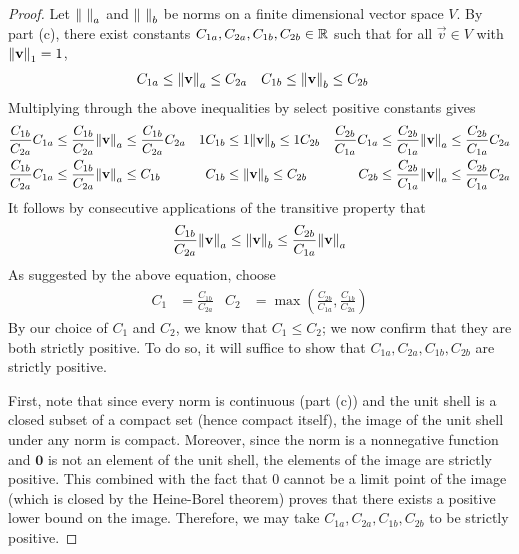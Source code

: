 \documentclass[../psets.tex]{subfiles}
\begin{document}
\begin{enumerate}
\begin{enumerate}
\begin{proof}
            Let $\norm{\ }_a$ and $\norm{\ }_b$ be norms on a finite dimensional vector space $V$. By part (c), there exist constants $C_{1a},C_{2a},C_{1b},C_{2b}\in\mathbb{R}$ such that for all $\vec{v}\in V$ with $\norm{\mathbf{v}}_1=1$,
            \begin{align*}
                C_{1a} &\leq \norm{\mathbf{v}}_a \leq C_{2a}&
                C_{1b} &\leq \norm{\mathbf{v}}_b \leq C_{2b}
            \end{align*}
            Multiplying through the above inequalities by select positive constants gives
            \begin{align*}
                \frac{C_{1b}}{C_{2a}}C_{1a} &\leq \frac{C_{1b}}{C_{2a}}\norm{\mathbf{v}}_a \leq \frac{C_{1b}}{C_{2a}}C_{2a}&
                1C_{1b} &\leq 1\norm{\mathbf{v}}_b \leq 1C_{2b}&
                \frac{C_{2b}}{C_{1a}}C_{1a} &\leq \frac{C_{2b}}{C_{1a}}\norm{\mathbf{v}}_a \leq \frac{C_{2b}}{C_{1a}}C_{2a}\\
                \frac{C_{1b}}{C_{2a}}C_{1a} &\leq \frac{C_{1b}}{C_{2a}}\norm{\mathbf{v}}_a \leq C_{1b}&
                C_{1b} &\leq \norm{\mathbf{v}}_b \leq C_{2b}&
                C_{2b} &\leq \frac{C_{2b}}{C_{1a}}\norm{\mathbf{v}}_a \leq \frac{C_{2b}}{C_{1a}}C_{2a}
            \end{align*}
            It follows by consecutive applications of the transitive property that
            \begin{equation*}
                \frac{C_{1b}}{C_{2a}}\norm{\mathbf{v}}_a \leq \norm{\mathbf{v}}_b \leq \frac{C_{2b}}{C_{1a}}\norm{\mathbf{v}}_a
            \end{equation*}
            As suggested by the above equation, choose
            \begin{align*}
                C_1 &= \frac{C_{1b}}{C_{2a}}&
                C_2 &= \max\left( \frac{C_{2b}}{C_{1a}},\frac{C_{1b}}{C_{2a}} \right)
            \end{align*}
            By our choice of $C_1$ and $C_2$, we know that $C_1\leq C_2$; we now confirm that they are both strictly positive. To do so, it will suffice to show that $C_{1a},C_{2a},C_{1b},C_{2b}$ are strictly positive.\par
            First, note that since every norm is continuous (part (c)) and the unit shell is a closed subset of a compact set (hence compact itself), the image of the unit shell under any norm is compact. Moreover, since the norm is a nonnegative function and $\bm{0}$ is not an element of the unit shell, the elements of the image are strictly positive. This combined with the fact that 0 cannot be a limit point of the image (which is closed by the Heine-Borel theorem) proves that there exists a positive lower bound on the image. Therefore, we may take $C_{1a},C_{2a},C_{1b},C_{2b}$ to be strictly positive.

\end{proof}
\end{enumerate}
\end{enumerate}
\end{document}
